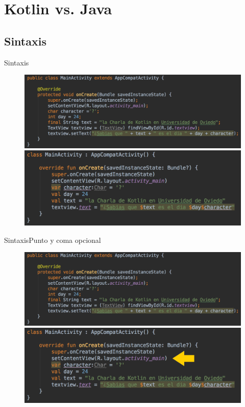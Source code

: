 \section{Kotlin vs. Java}
\subsection{Sintaxis}
\begin{frame}{Sintaxis}{}
    \begin{figure}[h]
    \centering
    \includegraphics[width=\textwidth]{images/kotlin_vs_java/java_basic}
    \vspace{0pt}
    \includegraphics[width=\textwidth]{images/kotlin_vs_java/kotlin_basic}
    \end{figure}
\end{frame}

\begin{frame}{Sintaxis}{Punto y coma opcional}
    \begin{figure}[h]
    \centering
    \includegraphics[width=\textwidth]{images/kotlin_vs_java/java_basic}
    \vspace{0pt}
    \includegraphics[width=\textwidth]{images/kotlin_vs_java/kotlin_semicolon}
    \end{figure}
\end{frame}

